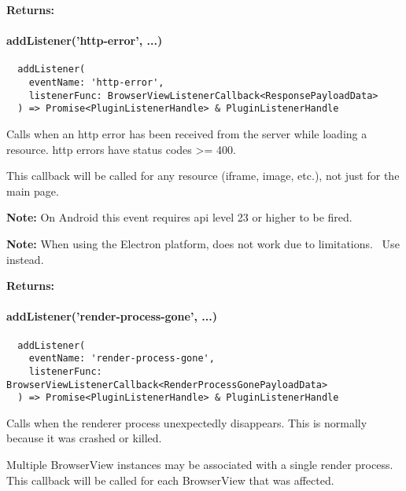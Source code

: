 \textbf{Returns:} 


\newpage

\paragraph{addListener('http-error', ...)}

\begin{verbatim}
  addListener(
    eventName: 'http-error',
    listenerFunc: BrowserViewListenerCallback<ResponsePayloadData>
  ) => Promise<PluginListenerHandle> & PluginListenerHandle
\end{verbatim}

Calls  when an \ac{http} error has been received from the server while loading a resource.
\ac{http} errors have status codes >= 400.

This callback will be called for any resource (iframe, image, etc.), not just for the main page.

\textbf{Note:} On Android this event requires \ac{api} level 23 or higher to be fired.~\cite{android:api}

\textbf{Note:} When using the Electron platform,  does not work due to limitations.~\cite{capacitor-electron}
Use  instead.

\textbf{Returns:} 


\paragraph{addListener('render-process-gone', ...)}

\begin{verbatim}
  addListener(
    eventName: 'render-process-gone',
    listenerFunc: BrowserViewListenerCallback<RenderProcessGonePayloadData>
  ) => Promise<PluginListenerHandle> & PluginListenerHandle
\end{verbatim}

Calls  when the renderer process unexpectedly disappears.
This is normally because it was crashed or killed.

Multiple BrowserView instances may be associated with a single render process.
This callback will be called for each BrowserView that was affected.

